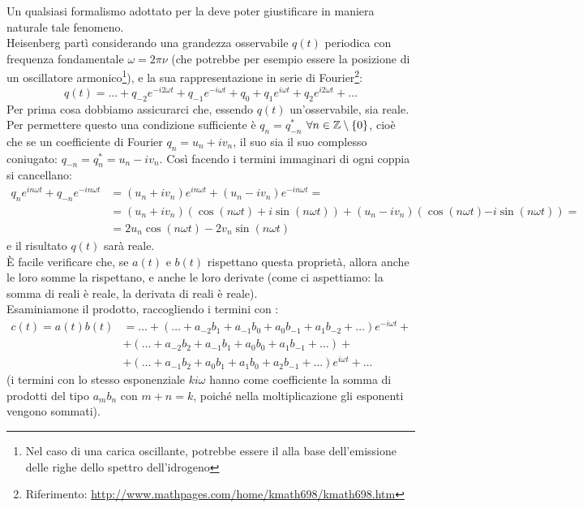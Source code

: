 \documentclass[FisicaTeorica.tex]{subfiles}
\begin{document}
Un qualsiasi formalismo adottato per la \MQ deve poter giustificare in maniera naturale tale fenomeno.\\
Heisenberg partì considerando una grandezza osservabile $q(t)$ periodica con frequenza fondamentale $\omega = 2\pi\nu$ (che potrebbe per esempio essere la posizione di un oscillatore armonico\footnote{Nel caso di una carica oscillante, potrebbe essere il  alla base dell'emissione delle righe dello spettro dell'idrogeno}), e la sua rappresentazione in serie di Fourier\footnote{Riferimento: \href{http://www.mathpages.com/home/kmath698/kmath698.htm}{http://www.mathpages.com/home/kmath698/kmath698.htm}}:
\[
q(t) = \dots + q_{-2}e^{-i2\omega t} + q_{-1}e^{-i\omega t} + q_0 + q_1 e^{i\omega t} + q_2 e^{i2\omega t} + \dots
\]
Per prima cosa dobbiamo assicurarci che, essendo $q(t)$ un'osservabile, sia reale. Per permettere questo una condizione sufficiente è $q_n = q_{-n}^*$ $\forall n\in \mathbb{Z}\setminus\{0\}$, cioè che se un coefficiente di Fourier $q_n = u_n + iv_n$, il suo  sia il suo complesso coniugato: $q_{-n} = q_{n}^* = u_n - iv_n$. Così facendo i termini immaginari di ogni coppia si cancellano:
\begin{align*}
q_n e^{in\omega t} + q_{-n}e^{-in\omega t} &= (u_n + iv_n)e^{in\omega t} + (u_n - iv_n)e^{-in\omega t} =\\
&= (u_n + iv_n)(\cos(n\omega t)+i\sin(n\omega t)) + (u_n-iv_n)(\cos(n\omega t) \bm{-} i\sin(n\omega t)) =\\
&= 2u_n\cos(n\omega t)-2v_n\sin(n\omega t)
\end{align*}
e il risultato $q(t)$ sarà reale.\\
È facile verificare che, se $a(t)$ e $b(t)$ rispettano questa proprietà, allora anche le loro somme la rispettano, e anche le loro derivate (come ci aspettiamo: la somma di reali è reale, la derivata di reali è reale).\\
Esaminiamone il prodotto, raccogliendo i termini con :
\begin{align*}
c(t) = a(t)b(t) &= \dots + (\dots +a_{-2}b_1 + a_{-1}b_0 + a_0 b_{-1} + a_1 b_{-2} + \dots )e^{-i\omega t} +\\
&+ (\dots +a_{-2}b_2 + a_{-1}b_1 + a_0 b_0 + a_1 b_{-1} + \dots ) + \\
&+ (\dots +a_{-1}b_2 + a_{0}b_1 + a_1 b_{0} + a_2 b_{-1} + \dots ) e^{i\omega t} + \dots
\end{align*}
(i termini con lo stesso esponenziale $ki\omega$ hanno come coefficiente la somma di prodotti del tipo $a_m b_n$ con $m+n=k$, poiché nella moltiplicazione gli esponenti vengono sommati).\\
\end{document}
